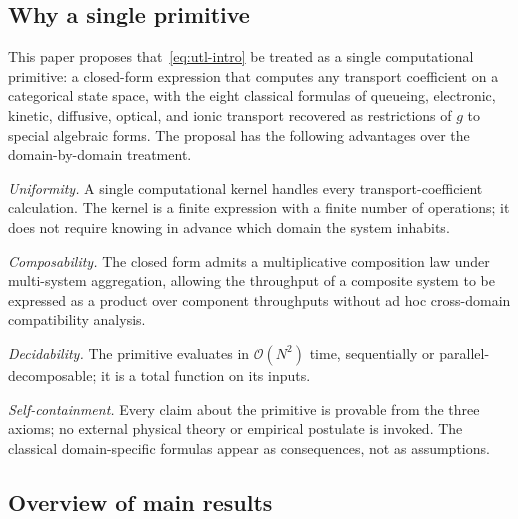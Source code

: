 \documentclass[twocolumn,11pt,a4paper]{article}
\newcommand{\cpl}{g}
\newcommand{\classcount}{N}
\begin{document}
\subsection{Why a single primitive}

This paper proposes that~\eqref{eq:utl-intro} be treated as a single computational primitive: a closed-form expression that computes any transport coefficient on a categorical state space, with the eight classical formulas of queueing, electronic, kinetic, diffusive, optical, and ionic transport recovered as restrictions of $\cpl$ to special algebraic forms. The proposal has the following advantages over the domain-by-domain treatment.

\emph{Uniformity.} A single computational kernel handles every transport-coefficient calculation. The kernel is a finite expression with a finite number of operations; it does not require knowing in advance which domain the system inhabits.

\emph{Composability.} The closed form admits a multiplicative composition law under multi-system aggregation, allowing the throughput of a composite system to be expressed as a product over component throughputs without ad hoc cross-domain compatibility analysis.

\emph{Decidability.} The primitive evaluates in $\mathcal{O}(\classcount^2)$ time, sequentially or parallel-decomposable; it is a total function on its inputs.

\emph{Self-containment.} Every claim about the primitive is provable from the three axioms; no external physical theory or empirical postulate is invoked. The classical domain-specific formulas appear as consequences, not as assumptions.

\subsection{Overview of main results}
\end{document}
